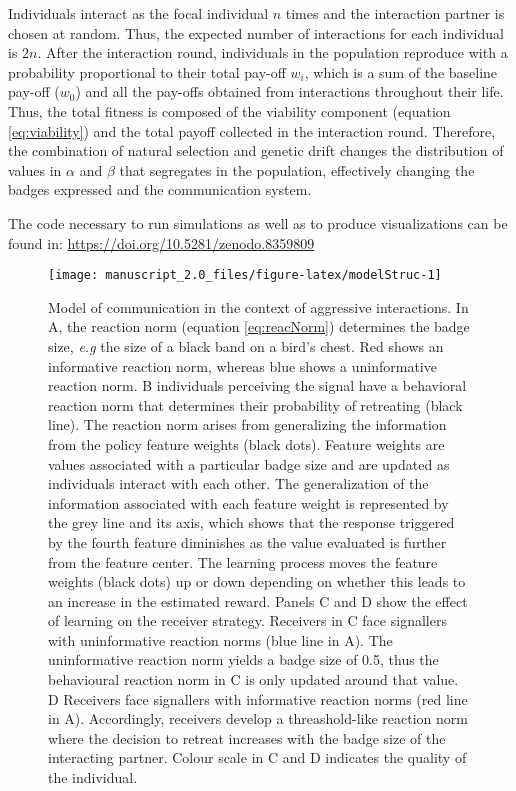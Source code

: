 \documentclass[
  12pt,
]{article}
\begin{document}
Individuals interact as the focal individual \(n\) times and the
interaction partner is chosen at random. Thus, the expected number of
interactions for each individual is \(2n\). After the interaction round,
individuals in the population reproduce with a probability proportional
to their total pay-off \(w_i\), which is a sum of the baseline pay-off
(\(w_0\)) and all the pay-offs obtained from interactions throughout
their life. Thus, the total fitness is composed of the viability
component (equation \ref{eq:viability}) and the total payoff collected
in the interaction round. Therefore, the combination of natural
selection and genetic drift changes the distribution of values in
\(\alpha\) and \(\beta\) that segregates in the population, effectively
changing the badges expressed and the communication system.

The code necessary to run simulations as well as to produce
visualizations can be found in:
\url{https://doi.org/10.5281/zenodo.8359809}

\begin{figure}

{\centering \texttt{[image: manuscript\_2.0\_files/figure-latex/modelStruc-1]} 

}

\caption{Model of communication in the context of aggressive interactions. In A, the reaction norm  (equation \ref{eq:reacNorm}) determines the badge size, \textit{e.g} the size of a black band on a bird's chest. Red shows an informative reaction norm, whereas blue shows a uninformative reaction norm. B individuals perceiving the signal have a behavioral reaction norm that determines their probability of retreating (black line). The reaction norm arises from generalizing the information from the policy feature weights (black dots). Feature weights are values associated with a particular badge size and are updated as individuals interact with each other. The generalization of the information associated with each feature weight is represented by the grey line and its axis, which shows that the response triggered by the fourth feature diminishes as the value evaluated is further from the feature center. The learning process moves the feature weights (black dots) up or down depending on whether this leads to an increase in the estimated reward. Panels C and D show the effect of learning on the receiver strategy. Receivers in C face signallers with uninformative reaction norms (blue line in A). The uninformative reaction norm yields a badge size of 0.5, thus the behavioural reaction norm in C is only updated around that value. D Receivers face signallers with informative reaction norms (red line in A). Accordingly, receivers develop a threashold-like reaction norm where the decision to retreat increases with the badge size of the interacting partner. Colour scale in C and D indicates the quality of the individual.}\label{fig:modelStruc}
\end{figure}
\end{document}
